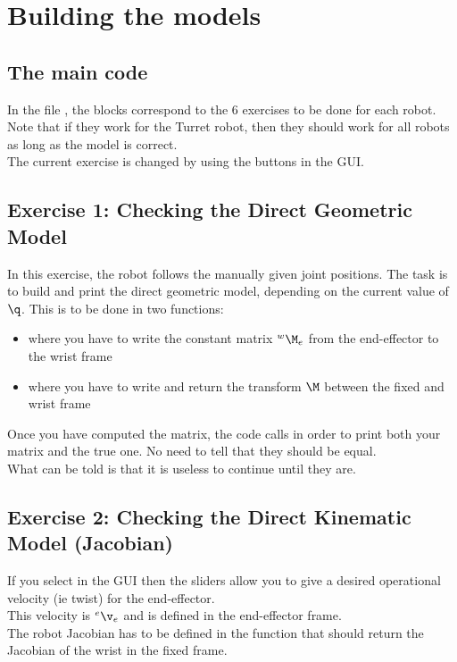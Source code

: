 \documentclass{ecnreport}
\begin{document}
  
  \section{Building the models}
  
  \subsection*{The main code}
  
  In the file , the  blocks correspond to the 6 exercises to be done for each robot. Note that if they work for the Turret robot, then 
  they should work for all robots as long as the model is correct. \\
  The current exercise is changed by using the buttons in the GUI.
  
  \subsection*{Exercise 1: Checking the Direct Geometric Model}
  
  In this exercise, the robot follows the manually given joint positions. The task is to build and print the direct geometric model, depending on the current value of $\q$. This is to be done in two functions:
  \begin{itemize}
    \item {} where you have to write the constant matrix $\wMe$ from the end-effector to the wrist frame
    \item {}  where you have to write and return the transform $\M$ between the fixed and wrist frame
  \end{itemize}
  Once you have computed the  matrix, the code calls  in order to print both your matrix and the true one. No need to tell that they should be equal.\\
  What can be told is that it is useless to continue until they are.
  
  \subsection*{Exercise 2: Checking the Direct Kinematic Model (Jacobian)}
  
  If you select  in the GUI then the sliders allow you to give a desired operational velocity (ie twist) for the end-effector.\\
  This velocity is ${}^e\v_e$ and is defined in the end-effector frame.\\
  The robot Jacobian has to be defined in the function  that should return the Jacobian of the wrist in the fixed frame.\\
  
\end{document}
